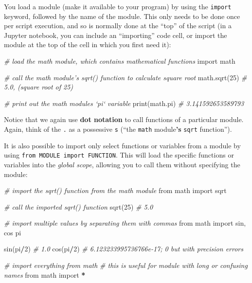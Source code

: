 \documentclass[]{book}
\newenvironment{Shaded}{\begin{snugshade}}{\end{snugshade}}
\newcommand{\DecValTok}[1]{\textcolor[rgb]{0.00,0.00,0.81}{#1}}
\newcommand{\ImportTok}[1]{#1}
\newcommand{\CommentTok}[1]{\textcolor[rgb]{0.56,0.35,0.01}{\textit{#1}}}
\newcommand{\OperatorTok}[1]{\textcolor[rgb]{0.81,0.36,0.00}{\textbf{#1}}}
\newcommand{\BuiltInTok}[1]{#1}
\newcommand{\NormalTok}[1]{#1}
\begin{document}
You load a module (make it available to your program) by using the
\texttt{import} keyword, followed by the name of the module. This only
needs to be done once per script execution, and so is normally done at
the ``top'' of the script (in a Jupyter notebook, you can include an
``importing'' code cell, or import the module at the top of the cell in
which you first need it):

\begin{Shaded}
\begin{Highlighting}[]
\CommentTok{# load the math module, which contains mathematical functions}
\ImportTok{import}\NormalTok{ math}

\CommentTok{# call the math module's sqrt() function to calculate square root}
\NormalTok{math.sqrt(}\DecValTok{25}\NormalTok{)  }\CommentTok{# 5.0, (square root of 25)}

\CommentTok{# print out the math modules `pi` variable}
\BuiltInTok{print}\NormalTok{(math.pi)  }\CommentTok{# 3.141592653589793}
\end{Highlighting}
\end{Shaded}

Notice that we again use \textbf{dot notation} to call functions of a
particular module. Again, think of the \texttt{.} as a possessive
\texttt{\textquotesingle{}s} (``the \texttt{math} module\textbf{'s}
\texttt{sqrt} function'').

It is also possible to import only select functions or variables from a
module by using \texttt{from\ MODULE\ import\ FUNCTION}. This will load
the specific functions or variables into the \emph{global scope},
allowing you to call them without specifying the module:

\begin{Shaded}
\begin{Highlighting}[]
\CommentTok{# import the sqrt() function from the math module}
\ImportTok{from}\NormalTok{ math }\ImportTok{import}\NormalTok{ sqrt}

\CommentTok{# call the imported sqrt() function}
\NormalTok{sqrt(}\DecValTok{25}\NormalTok{)  }\CommentTok{# 5.0}

\CommentTok{# import multiple values by separating them with commas}
\ImportTok{from}\NormalTok{ math }\ImportTok{import}\NormalTok{ sin, cos pi}

\NormalTok{sin(pi}\OperatorTok{/}\DecValTok{2}\NormalTok{)  }\CommentTok{# 1.0}
\NormalTok{cos(pi}\OperatorTok{/}\DecValTok{2}\NormalTok{)  }\CommentTok{# 6.123233995736766e-17; 0 but with precision errors}

\CommentTok{# import everything from math}
\CommentTok{# this is useful for module with long or confusing names}
\ImportTok{from}\NormalTok{ math }\ImportTok{import} \OperatorTok{*}
\end{Highlighting}
\end{Shaded}
\end{document}
